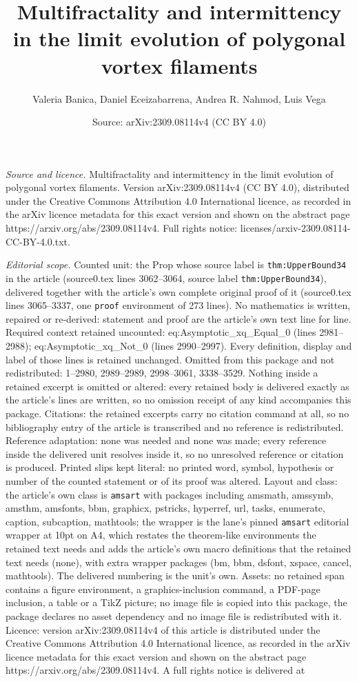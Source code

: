 \documentclass[10pt,a4paper]{amsart}
\title[Multifractality and intermittency in the limit evolution of ]{Multifractality and intermittency in the limit evolution of polygonal vortex filaments}
\author{Valeria Banica, Daniel Eceizabarrena, Andrea R. Nahmod, Luis Vega}
\date{Source: arXiv:2309.08114v4 (CC BY 4.0)}
\begin{document}
\maketitle

\noindent\emph{Source and licence.} Multifractality and intermittency in the limit evolution of polygonal vortex filaments. Version arXiv:2309.08114v4 (CC BY 4.0), distributed under the Creative Commons Attribution 4.0 International licence, as recorded in the arXiv licence metadata for this exact version and shown on the abstract page https://arxiv.org/abs/2309.08114v4. Full rights notice: licenses/arxiv-2309.08114-CC-BY-4.0.txt.\par\smallskip

\noindent\textit{Editorial scope.} Counted unit: the Prop whose source label is \texttt{thm:UpperBound34} in the article (source0.tex lines 3062--3064, source label \texttt{thm:UpperBound34}), delivered together with the article's own complete original proof of it (source0.tex lines 3065--3337, one \texttt{proof} environment of 273 lines). No mathematics is written, repaired or re-derived: statement and proof are the article's own text line for line. Required context retained uncounted: eq:Asymptotic\_xq\_Equal\_0 (lines 2981--2988); eq:Asymptotic\_xq\_Not\_0 (lines 2990--2997). Every definition, display and label of those lines is retained unchanged. Omitted from this package and not redistributed: 1--2980, 2989--2989, 2998--3061, 3338--3529. Nothing inside a retained excerpt is omitted or altered: every retained body is delivered exactly as the article's lines are written, so no omission receipt of any kind accompanies this package. Citations: the retained excerpts carry no citation command at all, so no bibliography entry of the article is transcribed and no reference is redistributed. Reference adaptation: none was needed and none was made; every reference inside the delivered unit resolves inside it, so no unresolved reference or citation is produced. Printed slips kept literal: no printed word, symbol, hypothesis or number of the counted statement or of its proof was altered. Layout and class: the article's own class is \texttt{amsart} with packages including amsmath, amssymb, amsthm, amsfonts, bbm, graphicx, pstricks, hyperref, url, tasks, enumerate, caption, subcaption, mathtools; the wrapper is the lane's pinned \texttt{amsart} editorial wrapper at 10pt on A4, which restates the theorem-like environments the retained text needs and adds the article's own macro definitions that the retained text needs (none), with extra wrapper packages (bm, bbm, dsfont, xspace, cancel, mathtools). The delivered numbering is the unit's own. Assets: no retained span contains a figure environment, a graphics-inclusion command, a PDF-page inclusion, a table or a TikZ picture; no image file is copied into this package, the package declares no asset dependency and no image file is redistributed with it. Licence: version arXiv:2309.08114v4 of this article is distributed under the Creative Commons Attribution 4.0 International licence, as recorded in the arXiv licence metadata for this exact version and shown on the abstract page https://arxiv.org/abs/2309.08114v4. A full rights notice is delivered at 
\end{document}
